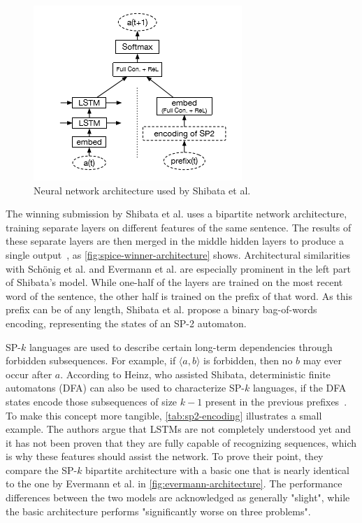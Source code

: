 \begin{figure}
    \centering
    \includegraphics[height=.4\textwidth]{gfx/spice-winner-architecture.png}
    \caption{Neural network architecture used by Shibata et al.~\cite{shibata2016bipartite}}
    \label{fig:spice-winner-architecture}
\end{figure}

The winning submission by Shibata et al. uses a bipartite network architecture, training separate layers on different features of the same sentence. The results of these separate layers are then merged in the middle hidden layers to produce a single output~\cite{shibata2016bipartite}, as \autoref{fig:spice-winner-architecture} shows. Architectural similarities with Schönig et al. and Evermann et al. are especially prominent in the left part of Shibata's model.
While one-half of the layers are trained on the most recent word of the sentence, the other half is trained on the prefix of that word. As this prefix can be of any length, Shibata et al. propose a binary bag-of-words encoding, representing the states of an SP-2 automaton.

SP-$k$ languages are used to describe certain long-term dependencies through forbidden subsequences. For example, if $\langle a,b \rangle$ is forbidden, then no $b$ may ever occur after $a$. According to Heinz, who assisted Shibata, deterministic finite automatons (DFA) can also be used to characterize SP-$k$ languages, if the DFA states encode those subsequences of size $k-1$ present in the previous prefixes~\cite{heinz2010estimatingSP}. To make this concept more tangible, \autoref{tab:sp2-encoding} illustrates a small example. The authors argue that LSTMs are not completely understood yet and it has not been proven that they are fully capable of recognizing sequences, which is why these features should assist the network. To prove their point, they compare the SP-$k$ bipartite architecture with a basic one that is nearly identical to the one by Evermann et al. in \autoref{fig:evermann-architecture}. The performance differences between the two models are acknowledged as generally "slight", while the basic architecture performs "significantly worse on three problems".

